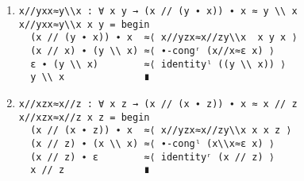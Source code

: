 \begin{enumerate}
\begin{verbatim}
  (x // (y ∙ z)) ∙ x  ≈⟨ sym (xz\\x≈x//zx x ((y ∙ z))) ⟩
  x ∙ ((y ∙ z) \\ x)  ≈⟨ middleBol x y z ⟩
  (x // z) ∙ (y \\ x) ∎
\end{verbatim}
\item
\begin{verbatim}
x//yxx≈y\\x : ∀ x y → (x // (y ∙ x)) ∙ x ≈ y \\ x
x//yxx≈y\\x x y = begin
  (x // (y ∙ x)) ∙ x  ≈⟨ x//yzx≈x//zy\\x  x y x ⟩
  (x // x) ∙ (y \\ x) ≈⟨ ∙-congʳ (x//x≈ε x) ⟩
  ε ∙ (y \\ x)        ≈⟨ identityˡ ((y \\ x)) ⟩
  y \\ x              ∎
\end{verbatim}
\item
\begin{verbatim}
x//xzx≈x//z : ∀ x z → (x // (x ∙ z)) ∙ x ≈ x // z
x//xzx≈x//z x z = begin
  (x // (x ∙ z)) ∙ x  ≈⟨ x//yzx≈x//zy\\x x x z ⟩
  (x // z) ∙ (x \\ x) ≈⟨ ∙-congˡ (x\\x≈ε x) ⟩
  (x // z) ∙ ε        ≈⟨ identityʳ (x // z) ⟩
  x // z              ∎    
\end{verbatim}
\end{enumerate}
